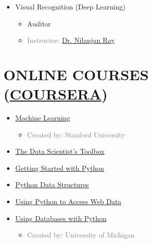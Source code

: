\begin{multicols}{2}
\begin{itemize}
	\item {} Visual Recognition (Deep Learning)
	\begin{itemize}
		\item Auditor 
		\item \textcolor{gray}{Instructor: \href{https://webdocs.cs.ualberta.ca/~nray1/}{Dr. Nilanjan Ray}}
	\end{itemize}
	
\end{itemize}
\end{multicols}


\section{ONLINE COURSES (\href{http://www.coursera.com}{COURSERA})}
\begin{multicols}{2}
\begin{itemize}
	
	
	\item {}  \href{https://www.coursera.org/learn/machine-learning}{Machine Learning}
	\begin{itemize}
		\item \textcolor{gray}{Created by: Stanford University}
	\end{itemize}
	
	\item  {}  \href{https://www.coursera.org/learn/data-scientists-tools}{The Data Scientist's Toolbox} 

	\item {} \href{https://www.coursera.org/learn/python}{Getting Started with Python} 
	
	\item  {} \href{https://www.coursera.org/learn/python-data}{Python Data Structures}  
	
	\item {}  \href{https://www.coursera.org/learn/python-network-data}{Using Python to Access Web Data} 
	
	\item  {} \href{https://www.coursera.org/learn/python-databases}{Using Databases with Python}  
	\begin{itemize}
		\item \textcolor{gray}{Created by: University of Michigan}
	\end{itemize}


\end{itemize}
\end{multicols}
